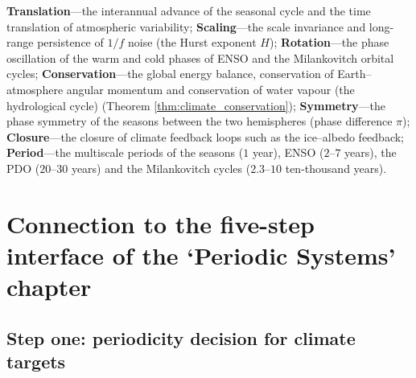 \begin{remark}\label{rem:climate_seven_themes}
\textbf{Translation}---the interannual advance of the seasonal cycle and the time translation of atmospheric variability; \textbf{Scaling}---the scale invariance and long-range persistence of $1/f$ noise (the Hurst exponent $H$); \textbf{Rotation}---the phase oscillation of the warm and cold phases of ENSO and the Milankovitch orbital cycles; \textbf{Conservation}---the global energy balance, conservation of Earth--atmosphere angular momentum and conservation of water vapour (the hydrological cycle) (Theorem \ref{thm:climate_conservation}); \textbf{Symmetry}---the phase symmetry of the seasons between the two hemispheres (phase difference $\pi$); \textbf{Closure}---the closure of climate feedback loops such as the ice--albedo feedback; \textbf{Period}---the multiscale periods of the seasons ($1$ year), ENSO ($2$--$7$ years), the PDO ($20$--$30$ years) and the Milankovitch cycles ($2.3$--$10$ ten-thousand years).
\end{remark}

\section{Connection to the five-step interface of the `Periodic Systems' chapter}
\label{sec:climate_five_steps}

\subsection{Step one: periodicity decision for climate targets}


